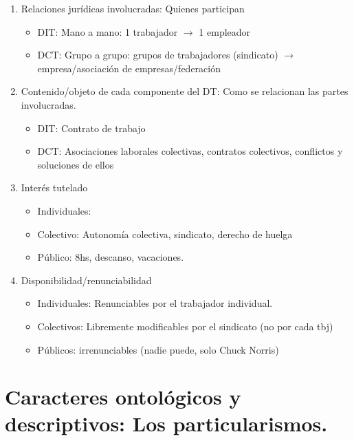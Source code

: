 \documentclass[spanish,12pt,a4paper,titlepage]{report}
\begin{document}
\begin{enumerate}
\item Relaciones jurídicas involucradas: Quienes participan
  \begin{itemize}
  \item DIT: Mano a mano: 1 trabajador $\rightarrow$ 1 empleador
  \item DCT: Grupo a grupo: grupos de trabajadores (sindicato) $\rightarrow$ empresa/asociación de empresas/federación
  \end{itemize}
\item Contenido/objeto de cada componente del DT: Como se relacionan las partes involucradas.
  \begin{itemize}
  \item DIT: Contrato de trabajo
  \item DCT: Asociaciones laborales colectivas, contratos colectivos, conflictos y soluciones de ellos
  \end{itemize}
\item Interés tutelado
  \begin{itemize}
  \item Individuales: 
  \item Colectivo: Autonomía colectiva, sindicato, derecho de huelga
  \item Público: 8hs, descanso, vacaciones.
  \end{itemize}
\item Disponibilidad/renunciabilidad
  \begin{itemize}
  \item Individuales: Renunciables por el trabajador individual.
  \item Colectivos: Libremente modificables por el sindicato (no por cada tbj)
  \item Públicos: irrenunciables (nadie puede, solo Chuck Norris)
  \end{itemize}
\end{enumerate}

\section{Caracteres ontológicos y descriptivos: Los particularismos.}
\label{sec:caracteres-ontologicos-y-descriptivos-los-particularismos}

\end{document}
